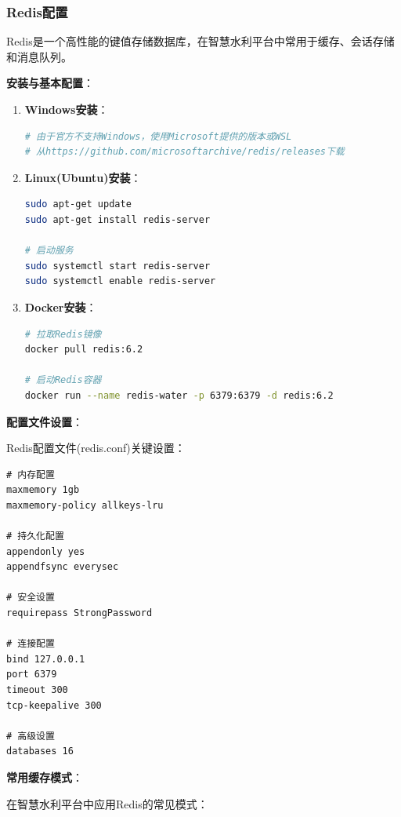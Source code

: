 \subsubsection{Redis配置}\label{redisux914dux7f6e}

Redis是一个高性能的键值存储数据库，在智慧水利平台中常用于缓存、会话存储和消息队列。

\textbf{安装与基本配置}：

\begin{enumerate}
\def\labelenumi{\arabic{enumi}.}
\item
  \textbf{Windows安装}：

\begin{lstlisting}[language=bash]
# 由于官方不支持Windows，使用Microsoft提供的版本或WSL
# 从https://github.com/microsoftarchive/redis/releases下载
\end{lstlisting}
\item
  \textbf{Linux(Ubuntu)安装}：

\begin{lstlisting}[language=bash]
sudo apt-get update
sudo apt-get install redis-server

# 启动服务
sudo systemctl start redis-server
sudo systemctl enable redis-server
\end{lstlisting}
\item
  \textbf{Docker安装}：

\begin{lstlisting}[language=bash]
# 拉取Redis镜像
docker pull redis:6.2

# 启动Redis容器
docker run --name redis-water -p 6379:6379 -d redis:6.2
\end{lstlisting}
\end{enumerate}

\textbf{配置文件设置}：

Redis配置文件(redis.conf)关键设置：

\begin{lstlisting}
# 内存配置
maxmemory 1gb
maxmemory-policy allkeys-lru

# 持久化配置
appendonly yes
appendfsync everysec

# 安全设置
requirepass StrongPassword

# 连接配置
bind 127.0.0.1
port 6379
timeout 300
tcp-keepalive 300

# 高级设置
databases 16
\end{lstlisting}

\textbf{常用缓存模式}：

在智慧水利平台中应用Redis的常见模式：


